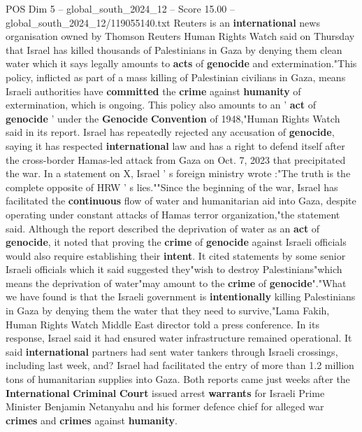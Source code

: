 \begin{textsample}{POS Dim 5 – global\_south\_2024\_12 – Score 15.00 – global\_south\_2024\_12/119055140.txt}  \label{ex:f5_pos_049}
Reuters is an \textbf{international} news organisation owned by Thomson Reuters Human Rights Watch said on Thursday that Israel has killed thousands of Palestinians in Gaza by denying them clean water which it says legally amounts to \textbf{acts} of \textbf{genocide} and extermination."This policy, inflicted as part of a mass killing of Palestinian civilians in Gaza, means Israeli authorities have \textbf{committed} the \textbf{crime} against \textbf{humanity} of extermination, which is ongoing.
This policy also amounts to an ' \textbf{act} of \textbf{genocide} ' under the \textbf{Genocide} \textbf{Convention} of 1948,"Human Rights Watch said in its report.
Israel has repeatedly rejected any accusation of \textbf{genocide}, saying it has respected \textbf{international} law and has a right to defend itself after the cross-border Hamas-led attack from Gaza on Oct. 7, 2023 that precipitated the war.
In a statement on X, Israel ' s foreign ministry wrote :"The truth is the complete opposite of HRW ' s lies.""Since the beginning of the war, Israel has facilitated the \textbf{continuous} flow of water and humanitarian aid into Gaza, despite operating under constant attacks of Hamas terror organization,"the statement said.
Although the report described the deprivation of water as an \textbf{act} of \textbf{genocide}, it noted that proving the \textbf{crime} of \textbf{genocide} against Israeli officials would also require establishing their \textbf{intent}.
It cited statements by some senior Israeli officials which it said suggested they"wish to destroy Palestinians"which means the deprivation of water"may amount to the \textbf{crime} of \textbf{genocide}"."What we have found is that the Israeli government is \textbf{intentionally} killing Palestinians in Gaza by denying them the water that they need to survive,"Lama Fakih, Human Rights Watch Middle East director told a press conference.
In its response, Israel said it had ensured water infrastructure remained operational.
It said \textbf{international} partners had sent water tankers through Israeli crossings, including last week, and?
Israel had facilitated the entry of more than 1.2 million tons of humanitarian supplies into Gaza.
Both reports came just weeks after the \textbf{International} \textbf{Criminal} \textbf{Court} issued arrest \textbf{warrants} for Israeli Prime Minister Benjamin Netanyahu and his former defence chief for alleged war \textbf{crimes} and \textbf{crimes} against \textbf{humanity}.

\end{textsample}
